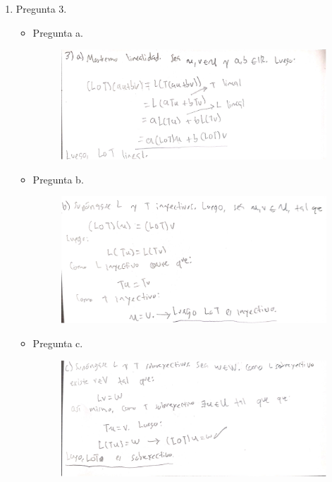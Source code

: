 \documentclass[fleqn]{article}
\begin{document}
\begin{enumerate}
     \item Pregunta 3.
       \begin{itemize}
         \item Pregunta a.
           \begin{figure}[H]
             \centering \includegraphics[scale=.5]{figs/3a}
           \end{figure}

         \item Pregunta b.
           \begin{figure}[H]
             \centering \includegraphics[scale=.5]{figs/3b}
           \end{figure}

         \item Pregunta c.
           \begin{figure}[H]
             \centering \includegraphics[scale=.5]{figs/3c}
           \end{figure}


\end{itemize}
\end{enumerate}
\end{document}
